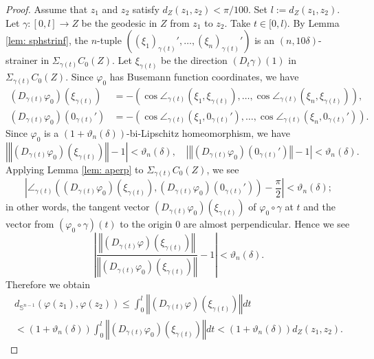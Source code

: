 \documentclass[10pt,a4paper]{amsart}
\newcommand{\Sph}{\operatorname{\mathbb{S}}}
\begin{document}
\begin{proof}
Assume that 
$z_1$ and $z_2$ satisfy $d_Z(z_1,z_2) < \pi/100$.
Set $l := d_Z(z_1,z_2)$.
Let $\gamma \colon [0,l] \to Z$ be the geodesic
in $Z$ from $z_1$ to $z_2$.
Take $t \in [0,l)$.
By Lemma \ref{lem: sphstrinf},
the $n$-tuple 
$\left( (\xi_1)_{\gamma(t)}', \dots, (\xi_n)_{\gamma(t)}' \right)$
is an $(n,10\delta)$-strainer in $\Sigma_{\gamma(t)}C_0(Z)$.
Let $\xi_{\gamma(t)}$ be the direction $\left (D_t\gamma \right)(1)$
in $\Sigma_{\gamma(t)}C_0(Z)$.
Since $\varphi_0$ has Busemann function coordinates,
we have
\begin{align*}
\left( D_{\gamma(t)} \varphi_0 \right) \left( \xi_{\gamma(t)} \right)
&= - \left( \cos \angle_{\gamma(t)}
\left( \xi_1, \xi_{\gamma(t)} \right), \dots,
\cos \angle_{\gamma(t)} \left( \xi_n, \xi_{\gamma(t)} \right) \right), \\
\left( D_{\gamma(t)} \varphi_0 \right) \left( 0_{\gamma(t)}' \right)
&= - \left( \cos \angle_{\gamma(t)} \left( \xi_1, 0_{\gamma(t)}' \right), 
\dots,
\cos \angle_{\gamma(t)} \left( \xi_n, 0_{\gamma(t)}' \right) \right).
\end{align*}
Since $\varphi_0$ is a 
$\left( 1+\vartheta_n(\delta) \right)$-bi-Lipschitz homeomorphism,
we have
\[
\left\vert 
\left\Vert
\left( D_{\gamma(t)} \varphi_0 \right) \left( \xi_{\gamma(t)} \right) 
\right\Vert - 1
\right\vert < \vartheta_n(\delta),
\quad
\left\vert 
\left\Vert
\left( D_{\gamma(t)} \varphi_0 \right) \left( 0_{\gamma(t)}' \right) 
\right\Vert - 1
\right\vert < \vartheta_n(\delta).
\]
Applying Lemma \ref{lem: aperp} to $\Sigma_{\gamma(t)}C_0(Z)$,
we see
\[
\left\vert 
\angle_{\gamma(t)} \left(
\left( D_{\gamma(t)} \varphi_0 \right) \left( \xi_{\gamma(t)} \right),
\left( D_{\gamma(t)} \varphi_0 \right) \left( 0_{\gamma(t)}' \right) \right)
- \frac{\pi}{2} 
\right\vert < \vartheta_n(\delta);
\]
in other words,
the tangent vector 
$\left( D_{\gamma(t)} \varphi_0 \right) \left( \xi_{\gamma(t)} \right)$
of $\varphi_0 \circ \gamma$ at $t$
and the vector from $(\varphi_0 \circ \gamma)(t)$ to the origin $0$ 
are almost perpendicular.
Hence we see
\[
\left\vert
\frac{
\left\Vert \left( D_{\gamma(t)} \varphi \right) 
\left( \xi_{\gamma(t)} \right) \right\Vert}
{\left\Vert \left( D_{\gamma(t)} \varphi_0 \right) 
\left( \xi_{\gamma(t)} \right) \right\Vert}
-1
\right\vert < \vartheta_n(\delta).
\]
Therefore we obtain
\begin{multline*}
d_{\Sph^{n-1}} \left( \varphi(z_1), \varphi(z_2) \right)
\le \int_0^l \left\Vert \left( D_{\gamma(t)} \varphi \right) 
\left( \xi_{\gamma(t)} \right) \right\Vert dt \\
< \left( 1+\vartheta_n(\delta) \right) 
\int_0^l \left\Vert \left( D_{\gamma(t)} \varphi_0 \right) 
\left( \xi_{\gamma(t)} \right) \right\Vert dt
< \left( 1+\vartheta_n(\delta) \right) d_Z(z_1,z_2).
\end{multline*}


\end{proof}
\end{document}
